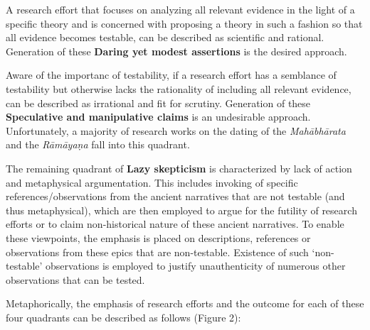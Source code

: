 A research effort that focuses on analyzing all relevant evidence in the light of a specific theory and is concerned with proposing a theory in such a fashion so that all evidence becomes testable, can be described as scientific and rational. Generation of these \textbf{Daring yet modest assertions} is the desired approach.

Aware of the importanc of testability, if a research effort has a semblance of testability but otherwise lacks the rationality of including all relevant evidence, can be described as irrational and fit for scrutiny. Generation of these \textbf{Speculative and manipulative claims} is an undesirable approach. Unfortunately, a majority of research works on the dating of the \textit{Mahābhārata} and the \textit{Rāmāyaṇa} fall into this quadrant.

The remaining quadrant of \textbf{Lazy skepticism} is characterized by lack of action and metaphysical argumentation. This includes invoking of specific references/observations from the ancient narratives that are not testable (and thus metaphysical), which are then employed to argue for the futility of research efforts or to claim non-historical nature of these ancient narratives. To enable these viewpoints, the emphasis is placed on descriptions, references or observations from these epics that are non-testable. Existence of such ‘non-testable’ observations is employed to justify unauthenticity of numerous other observations that can be tested.

Metaphorically, the emphasis of research efforts and the outcome for each of these four quadrants can be described as follows (Figure 2):

